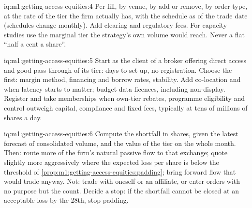 \begin{solution}{iq:m1:getting-access-equities:4}
Per fill, by venue, by add or remove, by order type, at the rate of the tier
the firm actually has, with the schedule as of the trade date (schedules
change monthly). Add clearing and regulatory fees. For capacity studies use
the marginal tier the strategy's own volume would reach. Never a flat
``half a cent a share''.
\end{solution}

\begin{solution}{iq:m1:getting-access-equities:5}
Start as the client of a broker offering direct access and good pass-through
of its tier: days to set up, no registration. Choose the 
first: margin method, financing and borrow rates, stability. Add co-location
and  when latency starts to matter; budget data licences,
including non-display. Register and take memberships when own-tier rebates,
programme eligibility and control outweigh capital, compliance and fixed
fees, typically at tens of millions of shares a day.
\end{solution}

\begin{solution}{iq:m1:getting-access-equities:6}
Compute the shortfall in shares, given the latest forecast of consolidated
volume, and the value of the tier on the whole month. Then: route more of
the firm's natural passive flow to that exchange; quote slightly more
aggressively where the expected loss per share is below the threshold of
\cref{prop:m1:getting-access-equities:padding}; bring forward flow that would
trade anyway. Not: trade with oneself or an affiliate, or enter orders with
no purpose but the count. Decide a stop: if the shortfall cannot be closed at
an acceptable loss by the 28th, stop padding.
\end{solution}
